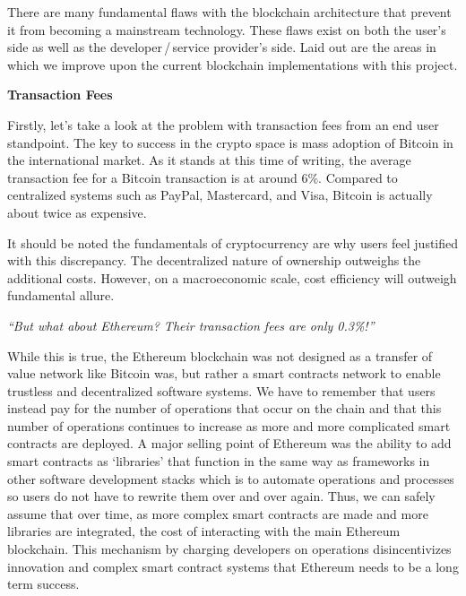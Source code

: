 \documentclass{%
	article}
\begin{document}
There are many fundamental flaws with the blockchain architecture that prevent it from becoming a mainstream technology. These flaws exist on both the user’s side as well as the developer\,/\,service provider’s side. Laid out are the areas in which we improve upon the current blockchain implementations with this project.

\begin{center}
\textbf{Transaction Fees}
\end{center}

Firstly, let’s take a look at the problem with transaction fees from an end user standpoint. The key to success in the crypto space is mass adoption of Bitcoin in the international market. As it stands at this time of writing, the average transaction fee for a Bitcoin transaction is at around 6\%\cite{bitcoinfees}. Compared to centralized systems such as PayPal\cite{paypalfees}, Mastercard\cite{mastercardfees}, and Visa\cite{visafees}, Bitcoin is actually about twice as expensive.

It should be noted the fundamentals of cryptocurrency are why users feel justified with this discrepancy. The decentralized nature of ownership outweighs the additional costs. However, on a macroeconomic scale, cost efficiency will outweigh fundamental allure.

\begin{center}
\textit{“But what about Ethereum? Their transaction fees are only 0.3\%!”}
\end{center}
	
While this is true, the Ethereum blockchain was not designed as a transfer of value network\cite{ethereumwp} like Bitcoin was, but rather a smart contracts network to enable trustless and decentralized software systems. We have to remember that users instead pay for the number of operations that occur on the chain and that this number of operations continues to increase as more and more complicated smart contracts are deployed. A major selling point of Ethereum was the ability to add smart contracts as ‘libraries’ that function in the same way as frameworks in other software development stacks which is to automate operations and processes so users do not have to rewrite them over and over again. Thus, we can safely assume that over time, as more complex smart contracts are made and more libraries are integrated, the cost of interacting with the main Ethereum blockchain. This mechanism by charging developers on operations disincentivizes innovation and complex smart contract systems that Ethereum needs to be a long term success.
\end{document}
